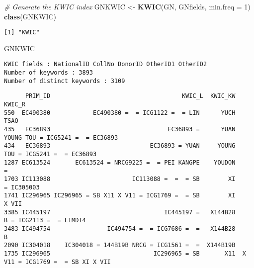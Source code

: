 \documentclass[
]{article}
\newenvironment{Shaded}{\begin{snugshade}}{\end{snugshade}}
\newcommand{\CommentTok}[1]{\textcolor[rgb]{0.56,0.35,0.01}{\textit{#1}}}
\newcommand{\DataTypeTok}[1]{\textcolor[rgb]{0.13,0.29,0.53}{#1}}
\newcommand{\DecValTok}[1]{\textcolor[rgb]{0.00,0.00,0.81}{#1}}
\newcommand{\KeywordTok}[1]{\textcolor[rgb]{0.13,0.29,0.53}{\textbf{#1}}}
\newcommand{\NormalTok}[1]{#1}
\newcommand{\OperatorTok}[1]{\textcolor[rgb]{0.81,0.36,0.00}{\textbf{#1}}}
\newcommand{\OtherTok}[1]{\textcolor[rgb]{0.56,0.35,0.01}{#1}}
\newcommand{\StringTok}[1]{\textcolor[rgb]{0.31,0.60,0.02}{#1}}
\begin{document}
\begin{Shaded}
\begin{Highlighting}[]
\CommentTok{# Generate the KWIC index}
\NormalTok{GNKWIC <-}\StringTok{ }\KeywordTok{KWIC}\NormalTok{(GN, GNfields, }\DataTypeTok{min.freq =} \DecValTok{1}\NormalTok{)}
\KeywordTok{class}\NormalTok{(GNKWIC)}
\end{Highlighting}
\end{Shaded}

\begin{verbatim}
[1] "KWIC"
\end{verbatim}

\begin{Shaded}
\begin{Highlighting}[]
\NormalTok{GNKWIC}
\end{Highlighting}
\end{Shaded}

\begin{verbatim}
KWIC fields : NationalID CollNo DonorID OtherID1 OtherID2
Number of keywords : 3893
Number of distinct keywords : 3109
\end{verbatim}

\begin{Shaded}
\end{Shaded}

\begin{verbatim}
      PRIM_ID                                     KWIC_L  KWIC_KW                            KWIC_R
550  EC490380            EC490380 =  = ICG1122 =  = LIN      YUCH                              TSAO
435   EC36893                                 EC36893 =      YUAN  YOUNG TOU = ICG5241 =  = EC36893
434   EC36893                            EC36893 = YUAN     YOUNG        TOU = ICG5241 =  = EC36893
1287 EC613524       EC613524 = NRCG9225 =  = PEI KANGPE    YOUDON                                 =
1703 IC113088                       IC113088 =  =  = SB        XI                        = IC305003
1741 IC296965 IC296965 = SB X11 X V11 = ICG1769 =  = SB        XI                             X VII
3385 IC445197                                IC445197 =   X144B28           B = ICG2113 =  = LIMDI4
3483 IC494754                IC494754 =  = ICG7686 =  =   X144B28                                 B
2090 IC304018    IC304018 = 144B19B NRCG = ICG1561 =  =  X144B19B                                  
1735 IC296965                             IC296965 = SB       X11  X V11 = ICG1769 =  = SB XI X VII
\end{verbatim}
\end{document}
